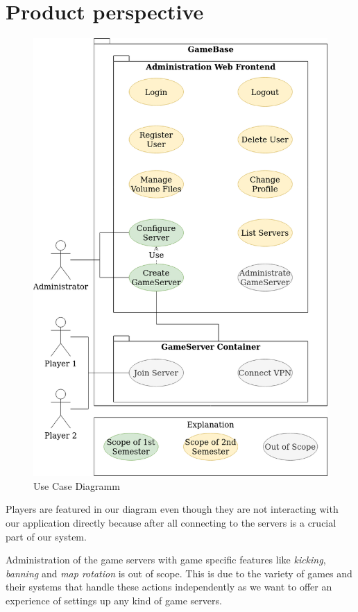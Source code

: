 \documentclass[a4paper,12pt,chapterprefix=false,bibliography=totoc,listof=totoc,]{scrreprt}
\begin{document}
\section{Product perspective}
\begin{figure}
	\includegraphics[width=\textwidth]{diagramms/Use_Case_Diagramm.png}
	\caption{Use Case Diagramm}
	\label{fig:ucd}
\end{figure}
Players are featured in our diagram even though they are not interacting with our application directly because after all connecting to the servers is a crucial part of our system.

Administration of the game servers with game specific features like \emph{kicking}, \emph{banning} and \emph{map rotation} is out of scope. This is due to the variety of games and their systems that handle these actions independently as we want to offer an experience of settings up any kind of game servers.
\end{document}
